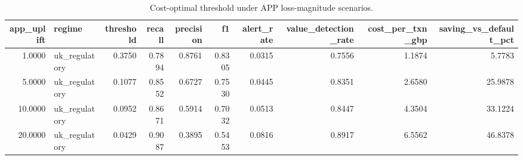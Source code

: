 \begin{table}
\caption{Cost-optimal threshold under APP loss-magnitude scenarios.}
\label{tab:table6_sensitivity_app_uplift}
\begin{tabular}{rlrrrrrrrr}
\toprule
app\_uplift & regime & threshold & recall & precision & f1 & alert\_rate & value\_detection\_rate & cost\_per\_txn\_gbp & saving\_vs\_default\_pct \\
\midrule
1.0000 & uk\_regulatory & 0.3750 & 0.7894 & 0.8761 & 0.8305 & 0.0315 & 0.7556 & 1.1874 & 5.7783 \\
5.0000 & uk\_regulatory & 0.1077 & 0.8552 & 0.6727 & 0.7530 & 0.0445 & 0.8351 & 2.6580 & 25.9878 \\
10.0000 & uk\_regulatory & 0.0952 & 0.8671 & 0.5914 & 0.7032 & 0.0513 & 0.8447 & 4.3504 & 33.1224 \\
20.0000 & uk\_regulatory & 0.0429 & 0.9087 & 0.3895 & 0.5453 & 0.0816 & 0.8917 & 6.5562 & 46.8378 \\
\bottomrule
\end{tabular}
\end{table}
